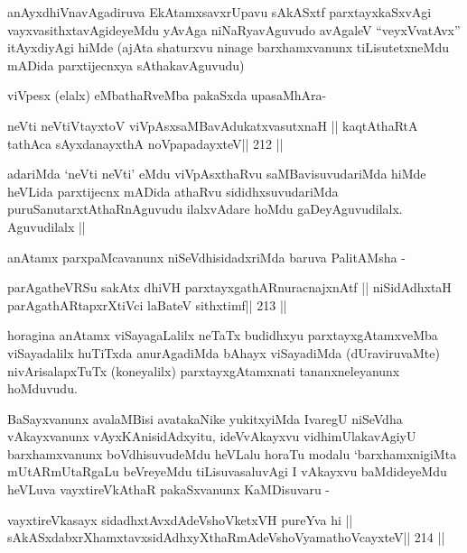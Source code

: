 \begin{artha}
anAyxdhiVnavAgadiruva EkAtamxsavxrUpavu sAkASxtf parxtayxkaSxvAgi
vayxvasithxtavAgideyeMdu yAvAga niNaRyavAguvudo avAgaleV
``veyxVvatAvx'' itAyxdiyAgi hiMde (ajAta shaturxvu ninage
barxhamxvanunx tiLisutetxneMdu mADida parxtijecnxya sAthakavAguvudu)
\end{artha}

\begin{artha}
viVpesx (elalx) eMbathaRveMba pakaSxda upasaMhAra-
\end{artha}

\begin{shl}
neVti neVtiVtayxtoV viVpAsxsaMBavAdukatxvasutxnaH ||
kaqtAthaRtA tathAca sAyxdanayxthA noVpapadayxteV\hfill || 212 ||
\end{shl}

\begin{artha}
adariMda `neVti neVti' eMdu viVpAsxthaRvu saMBavisuvudariMda hiMde
heVLida parxtijecnx mADida athaRvu sididhxsuvudariMda
puruSanutarxtAthaRnAguvudu ilalxvAdare hoMdu
gaDeyAguvudilalx. Aguvudilalx ||

anAtamx parxpaMcavanunx niSeVdhisidadxriMda baruva PalitAMsha -
\end{artha}

\begin{shl}
parAgatheVRSu sakAtx dhiVH parxtayxgathARnuracnajxnAtf ||
niSidAdhx\s taH parAgathARtapxrXtiVci laBateV sithxtimf\hfill || 213 ||
\end{shl}

\begin{artha}
horagina anAtamx viSayagaLalilx neTaTx budidhxyu parxtayxgAtamxveMba
viSayadalilx huTiTxda anurAgadiMda bAhayx viSayadiMda (dUraviruvaMte)
nivArisalapxTuTx (koneyalilx) parxtayxgAtamxnati tananxneleyanunx hoMduvudu.
\end{artha}

\begin{artha}
BaSayxvanunx avalaMBisi avatakaNike yukitxyiMda IvaregU niSeVdha
vAkayxvanunx vAyxKAnisidAdxyitu, ideVvAkayxvu vidhimUlakavAgiyU
barxhamxvanunx boVdhisuvudeMdu heVLalu horaTu modalu `barxhamxnigiMta
mUtARmUtaRgaLu beVreyeMdu tiLisuvasaluvAgi I vAkayxvu baMdideyeMdu
heVLuva vayxtireVkAthaR pakaSxvanunx KaMDisuvaru -
\end{artha}

\begin{shl}
vayxtireVkasayx sidadhxtAvxdAdeVshoVketxVH pureYva hi ||
sAkASxdabxrXhamxtavxsidAdhxyXthaRmAdeVshoV\s yamathoVcayxteV\hfill || 214 ||
\end{shl}

